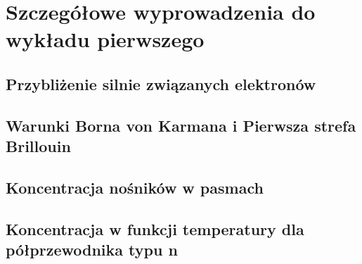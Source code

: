 \chapter{Szczegółowe wyprowadzenia do wykładu pierwszego} 
    \section{Przybliżenie silnie związanych elektronów} \label{appendix: quadratic approximation}
    \section{Warunki Borna von Karmana i Pierwsza strefa Brillouin}
    \section{Koncentracja nośników w pasmach}\label{appendix: carrier concentration}
    \section{Koncentracja w funkcji temperatury dla półprzewodnika typu n} \label{appendix: n(T) in n doped semiconductor}